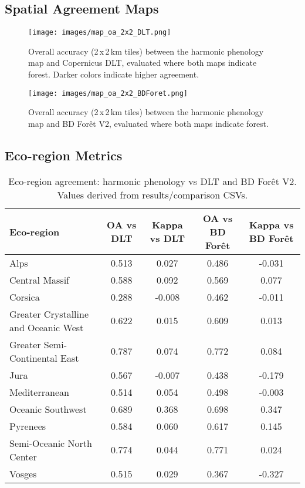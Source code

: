 \documentclass[utf8]{frontiers_suppmat}
\begin{document}
\subsection{Spatial Agreement Maps}

\begin{figure}[H]
    \centering
    \texttt{[image: images/map\_oa\_2x2\_DLT.png]}
    \caption{Overall accuracy (2\,x\,2\,km tiles) between the harmonic phenology map and Copernicus DLT, evaluated where both maps indicate forest. Darker colors indicate higher agreement.}
    \label{fig:oa_map_dlt}
\end{figure}

\begin{figure}[H]
    \centering
    \texttt{[image: images/map\_oa\_2x2\_BDForet.png]}
\caption{Overall accuracy (2\,x\,2\,km tiles) between the harmonic phenology map and BD For\^et V2, evaluated where both maps indicate forest.}
    \label{fig:oa_map_bdforet}
\end{figure}

\subsection{Eco-region Metrics}

\begin{table}[H]
    \centering
\caption{Eco-region agreement: harmonic phenology vs DLT and BD For\^et V2. Values derived from results/comparison CSVs.}
    \begin{tabular}{lcccc}
        \hline
        Eco-region & OA vs DLT & Kappa vs DLT & OA vs BD For\^et & Kappa vs BD For\^et \\
        \hline
        Alps & 0.513 & 0.027 & 0.486 & -0.031 \\
        Central Massif & 0.588 & 0.092 & 0.569 & 0.077 \\
        Corsica & 0.288 & -0.008 & 0.462 & -0.011 \\
        Greater Crystalline and Oceanic West & 0.622 & 0.015 & 0.609 & 0.013 \\
        Greater Semi-Continental East & 0.787 & 0.074 & 0.772 & 0.084 \\
        Jura & 0.567 & -0.007 & 0.438 & -0.179 \\
        Mediterranean & 0.514 & 0.054 & 0.498 & -0.003 \\
        Oceanic Southwest & 0.689 & 0.368 & 0.698 & 0.347 \\
        Pyrenees & 0.584 & 0.060 & 0.617 & 0.145 \\
        Semi-Oceanic North Center & 0.774 & 0.044 & 0.771 & 0.024 \\
        Vosges & 0.515 & 0.029 & 0.367 & -0.327 \\
        \hline
    \end{tabular}
    \label{tab:product_comparison_ecoregion}
\end{table}



\end{document}
